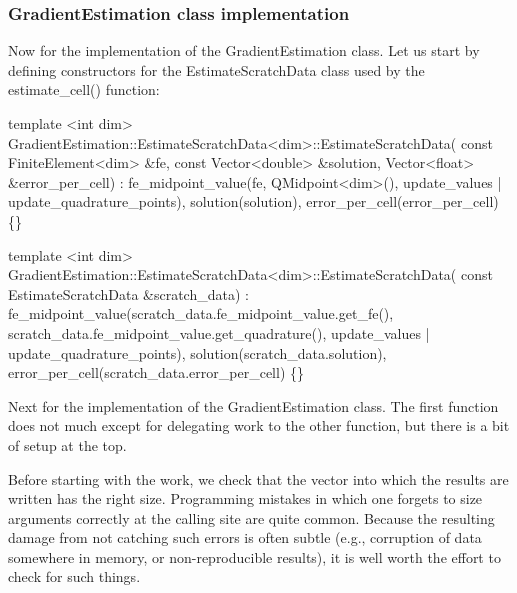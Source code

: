 \label{_GradientEstimationclassimplementation}%
 \subsubsection*{Gradient\+Estimation class implementation}

Now for the implementation of the {\ttfamily Gradient\+Estimation} class. Let us start by defining constructors for the {\ttfamily Estimate\+Scratch\+Data} class used by the {\ttfamily estimate\+\_\+cell()} function\+:


\begin{DoxyCode}
\textcolor{keyword}{template} <\textcolor{keywordtype}{int} dim>
GradientEstimation::EstimateScratchData<dim>::EstimateScratchData(
    \textcolor{keyword}{const} FiniteElement<dim> &fe, \textcolor{keyword}{const} Vector<double> &solution,
    Vector<float> &error\_per\_cell)
    : fe\_midpoint\_value(fe, QMidpoint<dim>(),
                        update\_values | update\_quadrature\_points),
      solution(solution),
      error\_per\_cell(error\_per\_cell)
\{\}


\textcolor{keyword}{template} <\textcolor{keywordtype}{int} dim>
GradientEstimation::EstimateScratchData<dim>::EstimateScratchData(
    \textcolor{keyword}{const} EstimateScratchData &scratch\_data)
    : fe\_midpoint\_value(scratch\_data.fe\_midpoint\_value.get\_fe(),
                        scratch\_data.fe\_midpoint\_value.get\_quadrature(),
                        update\_values | update\_quadrature\_points),
      solution(scratch\_data.solution),
      error\_per\_cell(scratch\_data.error\_per\_cell)
\{\}
\end{DoxyCode}


Next for the implementation of the {\ttfamily Gradient\+Estimation} class. The first function does not much except for delegating work to the other function, but there is a bit of setup at the top.

Before starting with the work, we check that the vector into which the results are written has the right size. Programming mistakes in which one forgets to size arguments correctly at the calling site are quite common. Because the resulting damage from not catching such errors is often subtle (e.\+g., corruption of data somewhere in memory, or non-\/reproducible results), it is well worth the effort to check for such things.



